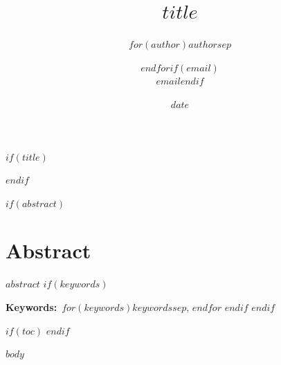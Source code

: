 \documentclass[12pt,a4paper]{article}
\title{$title$}
\author{$for(author)$$author$$sep$ \and $endfor$$if(email)$\\[3pt]\normalsize\texttt{$email$}$endif$}
\date{$date$}
\date{}
\begin{document}
$if(title)$
\maketitle
$endif$

$if(abstract)$
\section*{Abstract}
$abstract$
$if(keywords)$

\vspace{0.6em}\noindent\textbf{Keywords:}~$for(keywords)$$keywords$$sep$, $endfor$
$endif$
$endif$

$if(toc)$
\newpage
\tableofcontents
\newpage
$endif$

$body$
\end{document}
